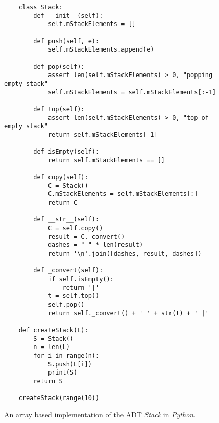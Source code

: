 \begin{figure}[!h]
  \centering
\begin{verbatim}
    class Stack:
        def __init__(self):
            self.mStackElements = []
    
        def push(self, e):
            self.mStackElements.append(e)
    
        def pop(self):
            assert len(self.mStackElements) > 0, "popping empty stack"
            self.mStackElements = self.mStackElements[:-1]
    
        def top(self):
            assert len(self.mStackElements) > 0, "top of empty stack"
            return self.mStackElements[-1]
    
        def isEmpty(self):
            return self.mStackElements == []
    
        def copy(self):
            C = Stack()
            C.mStackElements = self.mStackElements[:]
            return C
    
        def __str__(self):
            C = self.copy()
            result = C._convert()
            dashes = "-" * len(result)
            return '\n'.join([dashes, result, dashes])
    
        def _convert(self):
            if self.isEmpty():
                return '|'
            t = self.top()
            self.pop()
            return self._convert() + ' ' + str(t) + ' |'
    
    def createStack(L):
        S = Stack()
        n = len(L)
        for i in range(n):
            S.push(L[i])
            print(S)
        return S
    
    createStack(range(10))
\end{verbatim}
\vspace*{-0.3cm}
  \caption{An array based implementation of the ADT \textsl{Stack} in \textsl{Python}.}
  \label{fig:stack-array.stlx}
\end{figure} 

